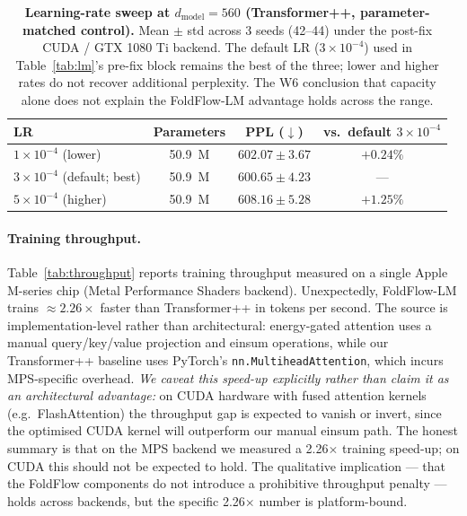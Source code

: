 \documentclass[fleqn,10pt]{article}
\begin{document}
\begin{table}[t]
\centering
\caption{\textbf{Learning-rate sweep at $d_\text{model}{=}560$
(Transformer++, parameter-matched control).} Mean $\pm$ std across 3
seeds (42--44) under the post-fix CUDA / GTX 1080 Ti backend. The
default LR ($3{\times}10^{-4}$) used in Table~\ref{tab:lm}'s pre-fix
block remains the best of the three; lower and higher rates do not
recover additional perplexity. The W6 conclusion that capacity alone
does not explain the FoldFlow-LM advantage holds across the range.}
\label{tab:d560_lr}
\small
\begin{tabular}{@{}lccc@{}}
\toprule
LR & Parameters & PPL ($\downarrow$) & vs.\ default $3\times10^{-4}$ \\
\midrule
$1\times10^{-4}$ (lower) & 50.9~M & $602.07 \pm 3.67$ & $+0.24\%$ \\
$3\times10^{-4}$ (default; best) & 50.9~M & $\mathbf{600.65 \pm 4.23}$ & --- \\
$5\times10^{-4}$ (higher) & 50.9~M & $608.16 \pm 5.28$ & $+1.25\%$ \\
\bottomrule
\end{tabular}
\end{table}

\paragraph{Training throughput.}
Table~\ref{tab:throughput} reports training throughput measured on a
single Apple M-series chip (Metal Performance Shaders backend).
Unexpectedly, FoldFlow-LM trains $\approx 2.26\times$ faster than
Transformer++ in tokens per second. The source is
implementation-level rather than architectural: energy-gated
attention uses a manual query/key/value projection and einsum
operations, while our Transformer++ baseline uses PyTorch's
\texttt{nn.MultiheadAttention}, which incurs MPS-specific overhead.
\emph{We caveat this speed-up explicitly rather than claim it as an
architectural advantage:} on CUDA hardware with fused attention
kernels (e.g.\ FlashAttention) the throughput gap is expected to
vanish or invert, since the optimised CUDA kernel will outperform
our manual einsum path. The honest summary is that on the MPS
backend we measured a 2.26$\times$ training speed-up; on CUDA this
should not be expected to hold. The qualitative implication --- that
the FoldFlow components do not introduce a prohibitive throughput
penalty --- holds across backends, but the specific 2.26$\times$
number is platform-bound.
\end{document}
